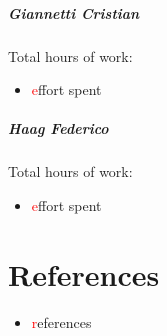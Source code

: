 \documentclass{report}
\newcommand\todo[1]{\textcolor{red}{#1}}
\begin{document}
		\paragraph{Giannetti Cristian} Total hours of work: 
			\begin{itemize}
				\item\todo effort spent
			\end{itemize}
		\paragraph{Haag Federico} Total hours of work: 
			\begin{itemize}
				\item \todo effort spent
			\end{itemize}
			
	\chapter{References}
	\thispagestyle{fancy}
	\begin{itemize}
		\item \todo references
	\end{itemize}
	
\end{document}
